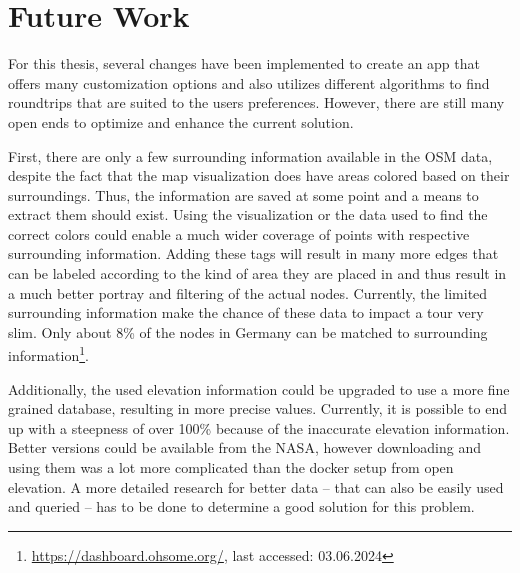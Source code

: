 \section{Future Work}
\label{sec:futureWork}

For this thesis, several changes have been implemented to create an app that offers many customization options and also utilizes different algorithms to find roundtrips that are suited to the users preferences.
However, there are still many open ends to optimize and enhance the current solution.

First, there are only a few surrounding information available in the OSM data, despite the fact that the map visualization does have areas colored based on their surroundings.
Thus, the information are saved at some point and a means to extract them should exist.
Using the visualization or the data used to find the correct colors could enable a much wider coverage of points with respective surrounding information. 
Adding these tags will result in many more edges that can be labeled according to the kind of area they are placed in and thus result in a much better portray and filtering of the actual nodes.
Currently, the limited surrounding information make the chance of these data to impact a tour very slim.
Only about 8\% of the nodes in Germany can be matched to surrounding information\footnote{\url{https://dashboard.ohsome.org/}, last accessed: 03.06.2024}.

Additionally, the used elevation information could be upgraded to use a more fine grained database, resulting in more precise values. 
Currently, it is possible to end up with a steepness of over 100\% because of the inaccurate elevation information.
Better versions could be available from the NASA, however downloading and using them was a lot more complicated than the docker setup from open elevation.
A more detailed research for better data -- that can also be easily used and queried -- has to be done to determine a good solution for this problem.

